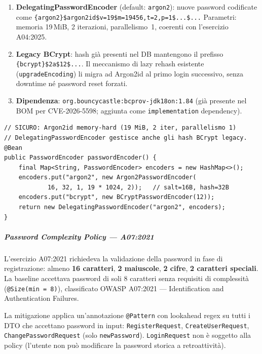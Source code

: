﻿\documentclass[a4paper,12pt]{report}
\begin{document}
\begin{enumerate}
  \item \textbf{DelegatingPasswordEncoder} (default: \texttt{argon2}): nuove password
        codificate come \texttt{\{argon2\}\$argon2id\$v=19\$m=19456,t=2,p=1\$...\$...}
        Parametri: memoria 19\,MiB, 2 iterazioni, parallelismo~1, coerenti con
        l'esercizio A04:2025.
  \item \textbf{Legacy BCrypt}: hash già presenti nel DB mantengono il prefisso
        \texttt{\{bcrypt\}\$2a\$12\$...}. Il meccanismo di lazy rehash esistente
        (\texttt{upgradeEncoding}) li migra ad Argon2id al primo login successivo,
        senza downtime né password reset forzati.
  \item \textbf{Dipendenza}: \texttt{org.bouncycastle:bcprov-jdk18on:1.84}
        (già presente nel BOM per CVE-2026-5598; aggiunta come
        \texttt{implementation} dependency).
\end{enumerate}

\begin{securebox}[title={Codice Sicuro --- SecurityConfig.java (Argon2id + DelegatingPasswordEncoder)}]
\begin{lstlisting}[style=java]
// SICURO: Argon2id memory-hard (19 MiB, 2 iter, parallelismo 1)
// DelegatingPasswordEncoder gestisce anche gli hash BCrypt legacy.
@Bean
public PasswordEncoder passwordEncoder() {
    final Map<String, PasswordEncoder> encoders = new HashMap<>();
    encoders.put("argon2", new Argon2PasswordEncoder(
            16, 32, 1, 19 * 1024, 2));   // salt=16B, hash=32B
    encoders.put("bcrypt", new BCryptPasswordEncoder(12));
    return new DelegatingPasswordEncoder("argon2", encoders);
}
\end{lstlisting}
\end{securebox}

\subparagraph{Password Complexity Policy — A07:2021}
L'esercizio A07:2021 richiedeva la validazione della password in fase di registrazione:
almeno \textbf{16 caratteri}, \textbf{2 maiuscole}, \textbf{2 cifre}, \textbf{2 caratteri speciali}.
La baseline accettava password di soli 8 caratteri senza requisiti di complessità
(\texttt{@Size(min~=~8)}), classificato OWASP A07:2021 --- Identification and Authentication Failures.

La mitigazione applica un'annotazione \texttt{@Pattern} con lookahead regex su tutti
i DTO che accettano password in input: \texttt{RegisterRequest}, \texttt{CreateUserRequest},
\texttt{ChangePasswordRequest} (solo \texttt{newPassword}).
\texttt{LoginRequest} non è soggetto alla policy (l'utente non può modificare la password
storica a retroattività).
\end{document}
